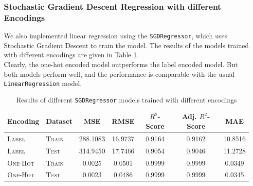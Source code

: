 \documentclass[12pt]{article}
\begin{document}
    \subsubsection*{Stochastic Gradient Descent Regression with different Encodings}
    We also implemented linear regression using the \texttt{SGDRegressor}, which uses Stochastic Gradient
    Descent to train the model. The results of the models trained with different encodings are given in Table \ref{tab:sgd}.
    \vspace*{5pt} \\
    Clearly, the one-hot encoded model outperforms the label encoded model. But both models perform well,
    and the performance is comparable with the usual \texttt{LinearRegression} model.
    \begin{table}[htbp]
        \centering
        \begin{tabular}{|l|l|c|c|c|c|c|}
            \hline
            Encoding & Dataset & MSE & RMSE & $R^{2}$-Score & Adj. $R^{2}$-Score & MAE \\
            \hline \hline
            \textsc{Label} & \textsc{Train} & 288.1083 & 16.9737 & 0.9164 & 0.9162 & 10.8516 \\
            \hline
            \textsc{Label} & \textsc{Test} & 314.9450 & 17.7466 & 0.9054 & 0.9046 & 11.2728 \\
            \hline
            \textsc{One-Hot} & \textsc{Train} & 0.0025 & 0.0501 & 0.9999 & 0.9999 & 0.0349 \\
            \hline
            \textsc{One-Hot} & \textsc{Test} & 0.0023 & 0.0486 & 0.9999 & 0.9999 & 0.0345 \\
            \hline
        \end{tabular}
        \caption{Results of different \texttt{SGDRegressor} models trained with different encodings}
        \label{tab:sgd}
    \end{table}
\end{document}

